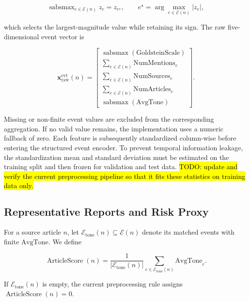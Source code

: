 \documentclass[letterpaper]{article} %
\begin{document}
\begin{equation}
\operatorname{sabsmax}_{e\in\mathcal E(n)} z_e
= z_{e^\star}, \qquad
e^\star = \arg\max_{e\in\mathcal E(n)} |z_e|,
\end{equation}

which selects the largest-magnitude value while retaining its sign. The raw five-dimensional event vector is

\begin{equation}
\mathbf x_{\mathrm{raw}}^{\mathrm{evt}}(n)
=
\begin{bmatrix}
\operatorname{sabsmax}(\mathrm{GoldsteinScale}) \\
\sum_{e\in\mathcal E(n)} \mathrm{NumMentions}_e \\
\sum_{e\in\mathcal E(n)} \mathrm{NumSources}_e \\
\sum_{e\in\mathcal E(n)} \mathrm{NumArticles}_e \\
\operatorname{sabsmax}(\mathrm{AvgTone})
\end{bmatrix}.
\end{equation}

Missing or non-finite event values are excluded from the corresponding aggregation. If no valid value remains, the implementation uses a numeric fallback of zero. Each feature is subsequently standardized column-wise before entering the structured event encoder. To prevent temporal information leakage, the standardization mean and standard deviation must be estimated on the training split and then frozen for validation and test data. \hl{TODO: update and verify the current preprocessing pipeline so that it fits these statistics on training data only.}

\subsection{Representative Reports and Risk Proxy}
\label{app:risk-proxy}

For a source article \(n\), let \(\mathcal E_{\mathrm{tone}}(n)\subseteq\mathcal E(n)\) denote its matched events with finite \(\mathrm{AvgTone}\). We define

\begin{equation}
\operatorname{ArticleScore}(n)
=
\frac{1}{|\mathcal E_{\mathrm{tone}}(n)|}
\sum_{e\in\mathcal E_{\mathrm{tone}}(n)}
\mathrm{AvgTone}_e.
\end{equation}

If \(\mathcal E_{\mathrm{tone}}(n)\) is empty, the current preprocessing rule assigns \(\operatorname{ArticleScore}(n)=0\).
\end{document}
